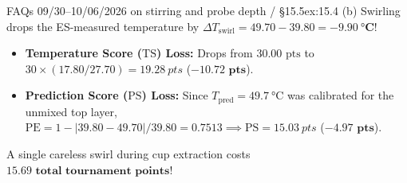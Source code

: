 \begin{twocol}[0.50]
\begin{workedexample}{FAQs 09/30--10/06/2026 on stirring and probe depth / §15.5}{ex:15.4}
(b) Swirling drops the ES-measured temperature by $\Delta T_{\mathrm{swirl}} = 49.70 - 39.80 = \mathbf{-\SI{9.90}{\celsius}}$!
\begin{itemize}
  \item \textbf{Temperature Score ($\mathrm{TS}$) Loss:} Drops from $30.00\text{ pts}$ to $30 \times (17.80/27.70) = \SI{19.28}{pts}$ ($\mathbf{-10.72\text{ pts}}$).
  \item \textbf{Prediction Score ($\mathrm{PS}$) Loss:} Since $T_{\mathrm{pred}} = \SI{49.7}{\celsius}$ was calibrated for the unmixed top layer, $\mathrm{PE} = 1 - |39.80 - 49.70|/39.80 = 0.7513 \implies \mathrm{PS} = \SI{15.03}{pts}$ ($\mathbf{-4.97\text{ pts}}$).
\end{itemize}
A single careless swirl during cup extraction costs $\mathbf{15.69\text{ total tournament points}}$!
\end{workedexample}
\end{twocol}


